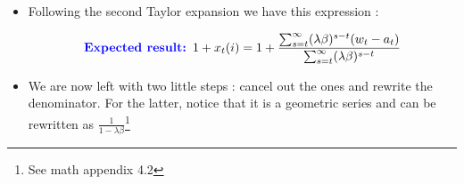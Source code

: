 \documentclass{article}
\begin{document}
\begin{enumerate}
\begin{itemize}
\begin{TDbox}
\begin{equation}
\begin{aligned}
               \epsilon_D \equiv \sum_{s=t}^\infty (\lambda\beta)^{s-t} \Phi_s
            \end{aligned}
            \right.
            \end{equation}
            This gives us this, which we will simplify using Taylor : 
            \begin{equation}
                1+x_t(i) = \frac{S +               \epsilon_N}{S +               \epsilon_D}
            \end{equation}
            We can rewrite this to take the following form : 
            \begin{equation}
                1+x_t(i) = \frac{S(1+\epsilon_N/S)}{S(1+\epsilon_D/S)} = \frac{(1+\epsilon_N/S)}{(1+\epsilon_D/S)}
            \end{equation}
            Now we can linearize the denominator using Taylor \footnote{Please refer to the math appendix 4.1} on $\frac{1}{1+\epsilon_D/S}$ (we take $X\equiv \epsilon_D/S$) 
            \begin{equation}
                \frac{1}{1+\epsilon_D/S}\sim (1-\epsilon_D/S)
            \end{equation}
            Now, we multiply it with the numerator and get rid of higher order terms :
            \begin{equation}
            \frac{(1+\epsilon_N/S)}{(1+\epsilon_D/S)} = (1-\epsilon_D/S)(1+\epsilon_N/S) = 1+\frac{\epsilon_N}{S}-\frac{\epsilon_D}{S} = 1 + \frac{\epsilon_N-\epsilon_D}{S}
            \end{equation}
            Notice the following : 
            \begin{equation}
                \epsilon_N-\epsilon_D = \sum_{s=t}^\infty (\lambda\beta)^{s-t}(w_t-a_t)
            \end{equation}
        \end{TDbox}
        \item Following the second Taylor expansion we have this expression : 
        \begin{expectedresultsbox}
        \begin{equation}
            \textcolor{blue}{\textbf{Expected result: }} 1 + x_t(i) = 1 + \frac{\sum_{s=t}^\infty (\lambda\beta)^{s-t}(w_t-a_t)}{\sum_{s=t}^\infty (\lambda\beta)^{s-t}}
        \end{equation}
        \end{expectedresultsbox}
        \item We are now left with two little steps : cancel out the ones and rewrite the denominator. For the latter, notice that it is a geometric series and can be rewritten as $\frac{1}{1-\lambda\beta}$\footnote{See math appendix 4.2}

\end{itemize}
\end{enumerate}
\end{document}
